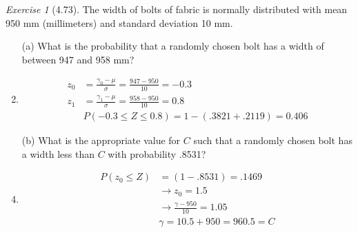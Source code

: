 \documentclass[12pt]{amsart}
\makeatletter
\theoremstyle{remark}
\newtheorem*{exercise}{Exercise}%
\renewenvironment{proof}[1][\proofname]{\par\doublespacing
  \pushQED{\qed}%
  \normalfont \topsep6\p@\@plus6\p@\relax
  \list{}{%
    \settowidth{\leftmargin}{\itshape\proofname:\hskip\labelsep}%
    \setlength{\labelwidth}{0pt}%
    \setlength{\itemindent}{-\leftmargin}%
  }%
  \item[\hskip\labelsep\itshape#1\@addpunct{:}]\ignorespaces
}{%
  \popQED\endlist\@endpefalse
  \singlespacing
}
\theoremstyle{mycomment}
\makeatother
\begin{document}
\begin{exercise}[4.73]
The width of bolts of fabric is normally distributed with mean 950 mm (millimeters) and standard deviation 10 mm.

\begin{enumerate}
    \item[(a)] What is the probability that a randomly chosen bolt has a width of between 947 and 958 mm?
\begin{proof}[Solution]
  \begin{align*}
    z_0 &= \frac{\gamma_0 - \mu}{\sigma} = \frac{947 - 950}{10} = -0.3 \\
    z_1 &= \frac{\gamma_1 - \mu}{\sigma} = \frac{958 - 950}{10} = 0.8  \\
        &  P(-0.3 \leq Z \leq 0.8) = 1 - (.3821 + .2119) = 0.406
  \end{align*}
\end{proof}
    \item[(b)] What is the appropriate value for $C$ such that a randomly chosen bolt has a width less than $C$ with probability .8531?
\begin{proof}[Solution]
  \begin{align*}
    P(z_0 \leq Z) & = (1-.8531) = .1469 \\
                  & \to z_0 = 1.5 \\
                  & \to \frac{\gamma - 950}{10} = 1.05 \\
                  & \gamma = 10.5 + 950 = 960.5 = C
  \end{align*}
\end{proof}
\end{enumerate}
\end{exercise}
\end{document}
